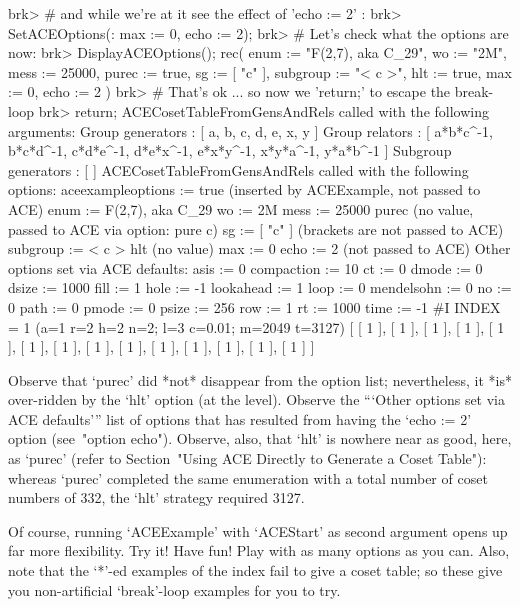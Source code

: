 brk> # and while we're at it see the effect of 'echo := 2' :                   
brk> SetACEOptions(: max := 0, echo := 2);                                     
brk> # Let's check what the options are now:                                   
brk> DisplayACEOptions();                                                      
rec(
  enum := "F(2,7), aka C_29",
  wo := "2M",
  mess := 25000,
  purec := true,
  sg := [ "c" ],
  subgroup := "< c >",
  hlt := true,
  max := 0,
  echo := 2 )
brk> # That's ok ... so now we 'return;' to escape the break-loop              
brk> return;                                                                   
ACECosetTableFromGensAndRels called with the following arguments:
 Group generators : [ a, b, c, d, e, x, y ]
 Group relators : [ a*b*c^-1, b*c*d^-1, c*d*e^-1, d*e*x^-1, e*x*y^-1, 
  x*y*a^-1, y*a*b^-1 ]
 Subgroup generators : [  ]
ACECosetTableFromGensAndRels called with the following options:
 aceexampleoptions := true (inserted by ACEExample, not passed to ACE)
 enum := F(2,7), aka C_29
 wo := 2M
 mess := 25000
 purec (no value, passed to ACE via option: pure c)
 sg := [ "c" ] (brackets are not passed to ACE)
 subgroup := < c >
 hlt (no value)
 max := 0
 echo := 2 (not passed to ACE)
Other options set via ACE defaults:
 asis := 0
 compaction := 10
 ct := 0
 dmode := 0
 dsize := 1000
 fill := 1
 hole := -1
 lookahead := 1
 loop := 0
 mendelsohn := 0
 no := 0
 path := 0
 pmode := 0
 psize := 256
 row := 1
 rt := 1000
 time := -1
#I  INDEX = 1 (a=1 r=2 h=2 n=2; l=3 c=0.01; m=2049 t=3127)
[ [ 1 ], [ 1 ], [ 1 ], [ 1 ], [ 1 ], [ 1 ], [ 1 ], [ 1 ], [ 1 ], [ 1 ], 
  [ 1 ], [ 1 ], [ 1 ], [ 1 ] ]
\endexample

Observe that  `purec'  did  *not*  disappear  from  the  option  list;
nevertheless, it *is* over-ridden by the `hlt' option (at  the  {\ACE}
level). Observe the  ```Other options set via ACE defaults''' list  of
options  that  has  resulted  from  having  the  `echo  :=  2'  option
(see~"option echo"). Observe, also, that  `hlt'  is  nowhere  near  as
good, here, as  `purec'  (refer  to  Section~"Using  ACE  Directly  to
Generate  a  Coset  Table"):  whereas  `purec'  completed   the   same
enumeration with a total number of coset numbers  of  332,  the  `hlt'
strategy required 3127.

Of course, running `ACEExample' with  `ACEStart'  as  second  argument
opens up far more flexibility. Try it! Have fun!  Play  with  as  many
options as you can. Also, note that the `*'-ed examples of  the  index
fail  to  give  a  coset  table;  so  these  give  you  non-artificial
`break'-loop examples for you to try.

